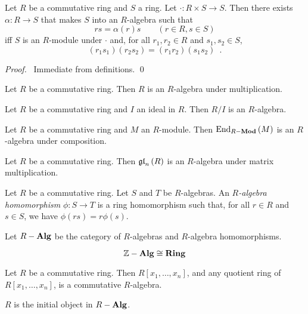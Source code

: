 \begin{prop}
Let $R$ be a commutative ring and $S$ a ring. Let $\cdot : R \times S \rightarrow S$. Then there exists $\alpha : R \rightarrow S$ that makes $S$ into an $R$-algebra such that
\[ rs = \alpha(r)s \qquad (r \in R, s \in S) \]
iff $S$ is an $R$-module under $\cdot$ and, for all $r_1,r_2 \in R$ and $s_1,s_2 \in S$,
\[ (r_1 s_1)(r_2 s_2) = (r_1 r_2)(s_1 s_2) \enspace . \]
\end{prop}

\begin{proof}
\pf\ Immediate from definitions. \qed
\end{proof}

\begin{ex}
Let $R$ be a commutative ring. Then $R$ is an $R$-algebra under multiplication.
\end{ex}

\begin{ex}
Let $R$ be a commutative ring and $I$ an ideal in $R$. Then $R/I$ is an $R$-algebra.
\end{ex}

\begin{ex}
Let $R$ be a commutative ring and $M$ an $R$-module. Then $\mathrm{End}_{{R}-\mathbf{Mod}} \left( {M} \right)$ is an $R$-algebra under composition.
\end{ex}

\begin{ex}
Let $R$ be a commutative ring. Then $\mathfrak{gl}_{n} \left( {R} \right)$ is an $R$-algebra under matrix multiplication.
\end{ex}

\begin{df}
Let $R$ be a commutative ring. Let $S$ and $T$ be $R$-algebras. An \emph{$R$-algebra homomorphism} $\phi : S \rightarrow T$ is a ring homomorphism such that, for all $r \in R$ and $s \in S$, we have $\phi(rs) = r\phi(s)$.

Let ${R}-\mathbf{Alg}$ be the category of $R$-algebras and $R$-algebra homomorphisms.
\end{df}

\begin{ex}
\[ {\mathbb{Z}}-\mathbf{Alg} \cong \mathbf{Ring} \]
\end{ex}

\begin{ex}
Let $R$ be a commutative ring. Then $R[x_1, \ldots, x_n]$, and any quotient ring of $R[x_1, \ldots, x_n]$, is a commutative $R$-algebra.
\end{ex}

\begin{ex}
$R$ is the initial object in ${R}-\mathbf{Alg}$.
\end{ex}

